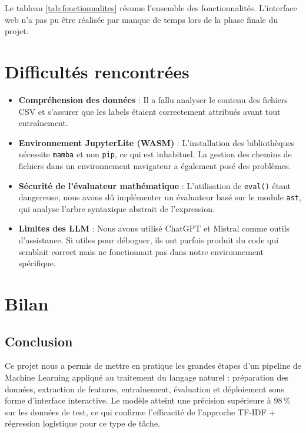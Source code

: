 \documentclass[a4paper, 12pt, twoside]{article}
\begin{document}
Le tableau \ref{tab:fonctionnalites} résume l'ensemble des fonctionnalités.
L'interface web n'a pas pu être réalisée par manque de temps lors de la
phase finale du projet.

\section{Difficultés rencontrées}

\begin{itemize}
  \item \textbf{Compréhension des données} : Il a fallu analyser le contenu
        des fichiers CSV et s'assurer que les labels étaient correctement
        attribués avant tout entraînement.

  \item \textbf{Environnement JupyterLite (WASM)} : L'installation des
        bibliothèques nécessite \texttt{mamba} et non \texttt{pip}, ce qui
        est inhabituel. La gestion des chemins de fichiers dans un
        environnement navigateur a également posé des problèmes.

  \item \textbf{Sécurité de l'évaluateur mathématique} : L'utilisation de
        \texttt{eval()} étant dangereuse, nous avons dû implémenter un
        évaluateur basé sur le module \texttt{ast}, qui analyse l'arbre
        syntaxique abstrait de l'expression.

  \item \textbf{Limites des LLM} : Nous avons utilisé ChatGPT et Mistral
        comme outils d'assistance. Si utiles pour déboguer, ils ont parfois
        produit du code qui semblait correct mais ne fonctionnait pas dans
        notre environnement spécifique.
\end{itemize}

\newpage
\section{Bilan}

\subsection{Conclusion}

Ce projet nous a permis de mettre en pratique les grandes étapes d'un
pipeline de Machine Learning appliqué au traitement du langage naturel :
préparation des données, extraction de features, entraînement, évaluation
et déploiement sous forme d'interface interactive. Le modèle atteint une
précision supérieure à 98\,\% sur les données de test, ce qui confirme
l'efficacité de l'approche TF-IDF + régression logistique pour ce type
de tâche.
\end{document}
